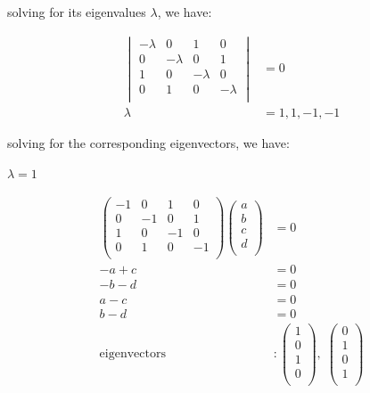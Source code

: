 \documentclass[11pt]{article}
\theoremstyle{definition}
\begin{document}
solving for its eigenvalues $\lambda$, we have:

\begin{align}
    \begin{vmatrix}
        -\lambda & 0 & 1 & 0\\
        0 & -\lambda & 0 & 1\\
        1 & 0 & -\lambda & 0\\
        0 & 1 & 0 & -\lambda\\
    \end{vmatrix} &= 0\\
    \lambda &= 1,1,-1,-1
\end{align}

solving for the corresponding eigenvectors, we have:

\underline{$\lambda=1$}

\begin{align}
    \begin{pmatrix}
        -1 & 0 & 1 & 0\\
        0 & -1 & 0 & 1\\
        1 & 0 & -1 & 0\\
        0 & 1 & 0 & -1\\
    \end{pmatrix} 
    \begin{pmatrix}
        a\\
        b\\
        c\\
        d\\
    \end{pmatrix}
    &= 0\\
    -a + c &= 0\\
    -b - d &= 0\\
    a - c &= 0\\
    b - d &= 0\\
    \text{eigenvectors} &:
    \begin{pmatrix}
        1\\
        0\\
        1\\
        0\\
    \end{pmatrix},\;
    \begin{pmatrix}
        0\\
        1\\
        0\\
        1\\
    \end{pmatrix}
\end{align}
\end{document}
